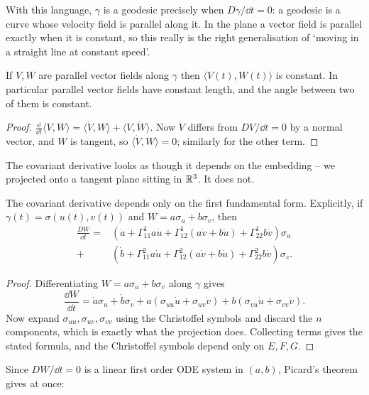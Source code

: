\documentclass[a4paper]{scrartcl}
\begin{document}
With this language, $\gamma$ is a geodesic precisely when $D\dot\gamma/\dd t = 0$: a geodesic is a curve whose velocity field is parallel along it. In the plane a vector field is parallel exactly when it is constant, so this really is the right generalisation of `moving in a straight line at constant speed'.

\begin{proposition}
    If $V, W$ are parallel vector fields along $\gamma$ then $\langle V(t), W(t)\rangle$ is constant. In particular parallel vector fields have constant length, and the angle between two of them is constant.
\end{proposition}
\begin{proof}
    $\frac{\dd}{\dd t}\langle V, W\rangle = \langle \dot V, W\rangle + \langle V, \dot W\rangle$. Now $\dot V$ differs from $DV/\dd t = 0$ by a normal vector, and $W$ is tangent, so $\langle \dot V, W\rangle = 0$; similarly for the other term.
\end{proof}

The covariant derivative looks as though it depends on the embedding -- we projected onto a tangent plane sitting in $\mathbb{R}^3$. It does not.

\begin{lemma}
    The covariant derivative depends only on the first fundamental form. Explicitly, if $\gamma(t) = \sigma(u(t),v(t))$ and $W = a\sigma_u + b\sigma_v$, then
    \begin{align*}
        \frac{DW}{\dd t} = &\left(\dot a + \Gamma^1_{11}a\dot u + \Gamma^1_{12}(a \dot v + b\dot u) + \Gamma^1_{22}b\dot v\right)\sigma_u \\
        + &\left(\dot b + \Gamma^2_{11}a\dot u + \Gamma^2_{12}(a\dot v + b \dot u) + \Gamma^2_{22}b\dot v\right)\sigma_v.
    \end{align*}
\end{lemma}
\begin{proof}
    Differentiating $W = a\sigma_u + b\sigma_v$ along $\gamma$ gives
    $$
    \frac{\dd W}{\dd t} = \dot a \sigma_u + \dot b \sigma_v + a\left(\sigma_{uu}\dot u + \sigma_{uv}\dot v\right) + b \left(\sigma_{vu}\dot u + \sigma_{vv}\dot v\right).
    $$
    Now expand $\sigma_{uu}, \sigma_{uv}, \sigma_{vv}$ using the Christoffel symbols and discard the $n$ components, which is exactly what the projection does. Collecting terms gives the stated formula, and the Christoffel symbols depend only on $E, F, G$.
\end{proof}

Since $DW/\dd t = 0$ is a linear first order ODE system in $(a, b)$, Picard's theorem gives at once:
\end{document}
